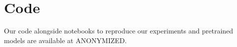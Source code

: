 \documentclass{article}
\begin{document}
\section{Code}\label{app:code}

Our code alongside notebooks to reproduce our experiments and pretrained models are available at 
ANONYMIZED.
\begin{table}[ht]
    \caption{Datasets used for the evaluation.}
    \label{table:test_datasets_table}
    \centering
    \tiny
    
\end{table}
\begin{table}[ht]
    \centering
    \caption{Meta-Datasets used for tuning the prior.}
    \tiny
    
    \label{table:reference_datasets_table}
\end{table}
\begin{table}[ht]
    \centering
    \caption{Meta-Datasets used for tuning the prior (continued).}
    \tiny
    
    \label{table:reference_datasets_table_2}
\end{table}
\end{document}
